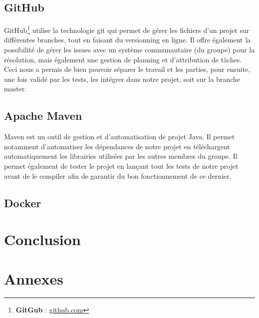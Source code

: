 \documentclass[a4paper,12pt]{article}
\begin{document}
		\subsection{GitHub}
		GitHub\footnote{\textbf{GitGub} : \href{http:/github.com}{github.com}} utilise la technologie git qui permet de gérer les fichiers d'un projet sur différentes branches, tout en faisant du versionning en ligne. Il offre également la possibilité de gérer les issues avec un système communautaire (du groupe) pour la résolution, mais également une gestion de planning et d'attribution de tâches. \\
		Ceci nous a permis de bien pouvoir séparer le travail et les parties, pour ensuite, une fois validé par les tests, les intégrer dans notre projet, soit sur la branche master. 
		
		\subsection{Apache Maven} \label{maven}
		Maven est un outil de gestion et d'automatisation de projet Java. Il permet notamment d'automatiser les dépendances de notre projet en téléchargent automatiquement les librairies utilisées par les autres membres du groupe. Il permet également de tester le projet en lançant tout les tests de notre projet avant de le compiler afin de garantir du bon fonctionnement de ce dernier. 
		
		\subsection{Docker}
	
	\section{Conclusion}
	
	\newpage
	\section{Annexes}

	
	
	
	
\end{document}
